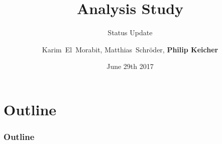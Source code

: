 \documentclass[18pt]{beamer}
\title[\ttbarH Analysis Study]{\ttbarH Analysis Study}
\subtitle{Status Update}
\author[Philip Keicher]{Karim~El~Morabit, Matthias~Schröder, \textbf{Philip Keicher}}
\institute{Institut für Experimentelle Kernphysik (IEKP)}
\date{June 29th 2017}
\begin{document}


\begin{frame}
\titlepage
\end{frame}

\section*{Outline}
\begin{frame}[label={outline}]
	\frametitle{Outline}
	\tableofcontents
\end{frame}









\beginbackup




\backupend
\end{document}
